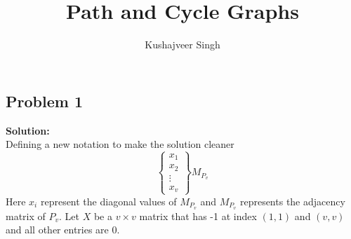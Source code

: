 \documentclass[12pt,a4paper]{article}
\title{Path and Cycle Graphs}
\author{Kushajveer Singh}
\date{}
\newcommand{\solution}{\noindent\textbf{Solution:}\\\indent}
\begin{document}
\maketitle

\subsection*{Problem 1}
\solution
Defining a new notation to make the solution cleaner
\begin{equation*}
    \begin{Bmatrix}
    x_1 \\
    x_2 \\
    \vdots \\
    x_v
    \end{Bmatrix}M_{P_v}
\end{equation*}
Here $x_i$ represent the diagonal values of $M_{P_v}$ and $M_{P_v}$ represents the adjacency matrix of $P_v$. Let $X$ be a $v\times v$ matrix that has -1 at index $(1,1)$ and $(v,v)$ and all other entries are 0.
\end{document}
